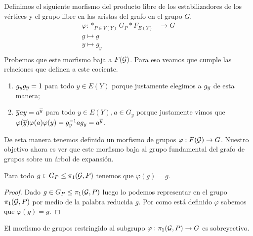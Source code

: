 \documentclass[tesis.tex]{subfiles}
\begin{document}
Definimos el siguiente morfismo del producto libre de los estabilizadores de los vértices y el grupo libre en las aristas del grafo en el grupo $G$.
\begin{align*}
	\varphi: \ast_{P \in V(Y)} G_P \ast F_{E(Y)} &\to G	\\
	g \mapsto g \\
	y \mapsto g_y \\
\end{align*}
Probemos que este morfismo baja a $F({\cal G})$. 
Para eso veamos que cumple las relaciones que definen a este cociente.
\begin{enumerate}
	\item $g_y g_{\overline y} = 1$ para todo $y \in E(Y)$ porque justamente elegimos a $g_{\overline y}$ de esta manera;
	\item $\overline y a y = a^{\overline y}$ para todo $y \in E(Y), a \in G_y$ porque justamente vimos que $\varphi(\overline y) \varphi (a) \varphi(y) = g_y^{-1}ag_y = a^{\overline y}$.
\end{enumerate}

De esta manera tenemos definido un morfismo de grupos $\varphi: F({\cal G}) \to G$.
Nuestro objetivo ahora es ver que este morfismo baja al grupo fundamental del grafo de grupos sobre un árbol de expansión.


\begin{lema}\label{lema_morfismo_pi1_inyectivo}
	Para todo $g \in G_P \le \pi_1({\cal G}, P)$ tenemos que $\varphi(g)=g$.
\end{lema}

\begin{proof}
	Dado $g \in G_P \le \pi_1({\cal G}, P)$ luego lo podemos representar en el grupo $\pi_1({\cal G}, P)$ por medio de la palabra reducida $g$.
	Por como está definido $\varphi$ sabemos que $\varphi(g) = g$. 
\end{proof}

\begin{prop}
	El morfismo de grupos restringido al subgrupo $\varphi: \pi_1({\cal G}, P) \to G$ es sobreyectivo.
\end{prop}
\end{document}
